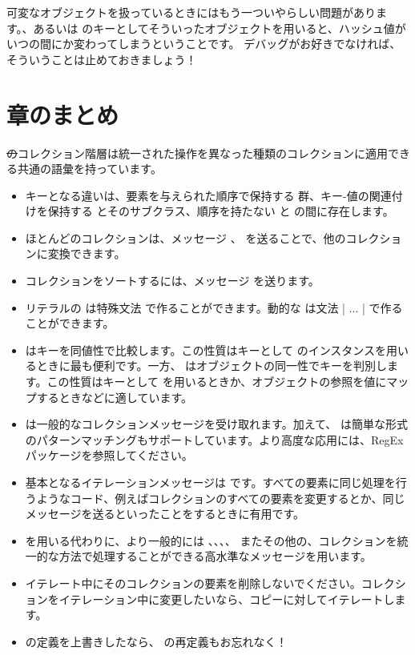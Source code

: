 \documentclass[a4paper,10pt,twoside]{book}
\begin{document}
可変なオブジェクトを扱っているときにはもう一ついやらしい問題があります。\ie {}、あるいは  のキーとしてそういったオブジェクトを用いると、ハッシュ値がいつの間にか変わってしまうということです。
デバッグがお好きでなければ、そういうことは止めておきましょう！

\section{章のまとめ}

\st のコレクション階層は統一された操作を異なった種類のコレクションに適用できる共通の語彙を持っています。

\begin{itemize}
  \item キーとなる違いは、要素を与えられた順序で保持する  群、キー-値の関連付けを保持する  とそのサブクラス、順序を持たない  と  の間に存在します。
  \item ほとんどのコレクションは、メッセージ 、 \etc を送ることで、他のコレクションに変換できます。
  \item コレクションをソートするには、メッセージ  を送ります。
  \item リテラルの  は特殊文法  で作ることができます。動的な  は文法 \ct|{ ... }| で作ることができます。
  \item {} はキーを同値性で比較します。この性質はキーとして  のインスタンスを用いるときに最も便利です。一方、 はオブジェクトの同一性でキーを判別します。この性質はキーとして  を用いるときか、オブジェクトの参照を値にマップするときなどに適しています。
  \item {} は一般的なコレクションメッセージを受け取れます。加えて、 は簡単な形式のパターンマッチングもサポートしています。より高度な応用には、RegEx パッケージを参照してください。
  \item 基本となるイテレーションメッセージは  です。すべての要素に同じ処理を行うようなコード、例えばコレクションのすべての要素を変更するとか、同じメッセージを送るといったことをするときに有用です。
  \item {} を用いる代わりに、より一般的には 、、、、 またその他の、コレクションを統一的な方法で処理することができる高水準なメッセージを用います。
  \item イテレート中にそのコレクションの要素を削除しないでください。コレクションをイテレーション中に変更したいなら、コピーに対してイテレートします。
  \item \ct{=} の定義を上書きしたなら、 の再定義もお忘れなく！
\end{itemize}

\ifx\wholebook\relax\else
   
   
\end{document}
